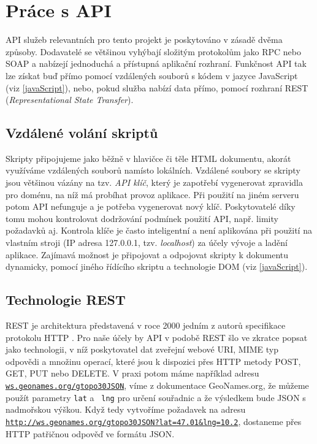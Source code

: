 \section{Práce s API}\label{api}
API služeb relevantních pro tento projekt je poskytováno v zásadě
dvěma způsoby. Dodavatelé se většinou vyhýbají
složitým protokolům jako RPC nebo SOAP a nabízejí jednoduchá a
přístupná aplikační rozhraní. Funkčnost API tak lze získat buď přímo
pomocí vzdálených souborů s kódem v jazyce JavaScript (viz
\ref{javaScript}), nebo, pokud služba nabízí data přímo, pomocí
rozhraní REST ({\it Representational State Transfer}).

\subsection{Vzdálené volání skriptů}
Skripty připojujeme jako běžně v hlavičce či těle HTML
dokumentu, akorát využíváme vzdálených souborů namísto lokálních.
Vzdálené soubory se skripty jsou většinou vázány na tzv. {\it API
klíč}, který je zapotřebí vygenerovat zpravidla pro doménu, na níž má
probíhat provoz aplikace. Při použití na jiném serveru potom API
nefunguje a je potřeba vygenerovat nový klíč. Poskytovatelé díky tomu
mohou kontrolovat dodržování podmínek použití API, např. limity
požadavků aj. Kontrola klíče je často inteligentní a není aplikována
při použití na vlastním stroji (IP adresa 127.0.0.1, tzv. {\it
localhost}) za účely vývoje a ladění aplikace. Zajímavá možnost je
připojovat a odpojovat skripty k dokumentu dynamicky, pomocí jiného
řídícího skriptu a technologie DOM (viz \ref{javaScript}).

\subsection{Technologie REST}\label{rest}
REST je architektura představená v roce 2000 jedním z autorů
specifikace protokolu HTTP \cite{rest}. Pro naše účely by API v
podobě REST šlo ve zkratce popsat jako technologii, v níž poskytovatel dat zveřejní webové URI, MIME typ odpovědi a množinu operací, které jsou k dispozici přes HTTP metody POST, GET, PUT nebo DELETE. V praxi
potom máme například adresu {\tt \url{ws.geonames.org/gtopo30JSON}},
víme z dokumentace GeoNames.org, že můžeme použít parametry {\tt lat} a {\tt
lng} pro určení souřadnic a že výsledkem bude JSON s nadmořskou
výškou. Když tedy vytvoříme požadavek na adresu
{\tt \url{http://ws.geonames.org/gtopo30JSON?lat=47.01&lng=10.2}},
dostaneme přes HTTP patřičnou odpověď ve formátu JSON.

